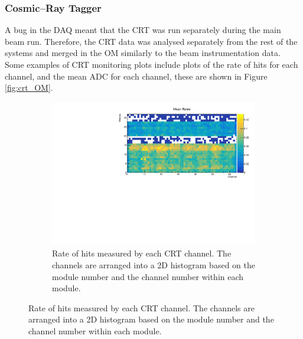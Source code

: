 \subsubsection*{Cosmic--Ray Tagger}
A bug in the DAQ meant that the CRT was run separately during the main beam 
run. Therefore, the CRT data was analysed separately from the rest of the 
\protodune{} systems and merged in the OM similarly to the beam instrumentation 
data. Some examples of CRT monitoring plots include plots of the rate of hits
for each channel, and the mean ADC for each channel, these are shown in Figure
\ref{fig:crt_OM}.

\begin{figure}

	\centering

	\begin{subfigure}[b]{0.8\textwidth}
		\centering
		\vspace{3mm}
		\includegraphics[width=\textwidth]{figures/crt_rate_om.pdf}
		\caption {Rate of hits measured by each CRT channel. The channels are
		arranged into a 2D histogram based on the module number and the channel
		number within each module.}
		\label{fig:crt_rate_om}
	\end{subfigure}


\end{figure}
